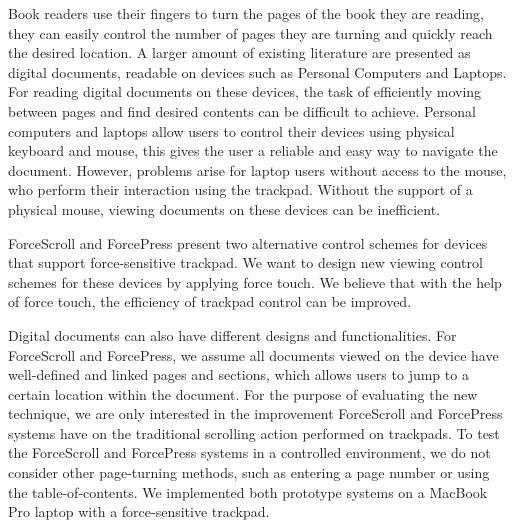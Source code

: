 \documentclass{sigchi}
\begin{document}
Book readers use their fingers to turn the pages of the book they are reading, they can easily control the number of pages they are turning and quickly reach the desired location. A larger amount of existing literature are presented as digital documents, readable on devices such as Personal Computers and Laptops. For reading digital documents on these devices, the task of efficiently moving between pages and find desired contents can be difficult to achieve. Personal computers and laptops allow users to control their devices using physical keyboard and mouse, this gives the user a reliable and easy way to navigate the document. However, problems arise for laptop users without access to the mouse, who perform their interaction using the trackpad. Without the support of a physical mouse, viewing documents on these devices can be inefficient. 



ForceScroll and ForcePress present two alternative control schemes for devices that support force-sensitive trackpad. We want to design new viewing control schemes for these devices by applying force touch. We believe that with the help of force touch, the efficiency of trackpad control can be improved. 


Digital documents can also have different designs and functionalities. For ForceScroll and ForcePress, we assume all documents viewed on the device have well-defined and linked pages and sections, which allows users to jump to a certain location within the document. For the purpose of evaluating the new technique, we are only interested in the improvement ForceScroll and ForcePress systems have on the traditional scrolling action performed on trackpads. To test the ForceScroll and ForcePress systems in a controlled environment, we do not consider other page-turning methods, such as entering a page number or using the table-of-contents. We implemented both prototype systems on a MacBook Pro laptop with a force-sensitive trackpad.    
  
\end{document}

